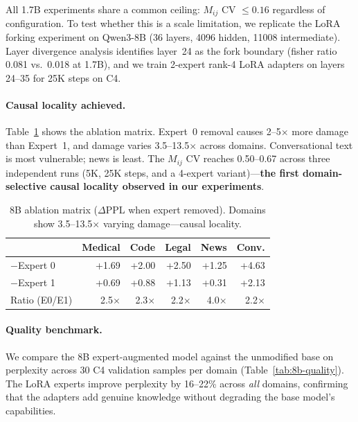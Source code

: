 \documentclass{article}
\begin{document}
All 1.7B experiments share a common ceiling: $M_{ij}$ CV $\leq 0.16$ regardless
of configuration. To test whether this is a scale limitation, we replicate the
LoRA forking experiment on Qwen3-8B (36 layers, 4096 hidden, 11008
intermediate). Layer divergence analysis identifies layer~24 as the fork
boundary (fisher ratio 0.081 vs.\ 0.018 at 1.7B), and we train 2-expert
rank-4 LoRA adapters on layers 24--35 for 25K steps on C4.

\paragraph{Causal locality achieved.}
Table~\ref{tab:8b-mij} shows the ablation matrix. Expert~0 removal causes
2--5$\times$ more damage than Expert~1, and damage varies 3.5--13.5$\times$
across domains. Conversational text is most vulnerable; news is least. The
$M_{ij}$ CV reaches 0.50--0.67 across three independent runs (5K, 25K steps,
and a 4-expert variant)---\textbf{the first domain-selective causal locality
observed in our experiments}.

\begin{table}[h]
\centering
\caption{8B ablation matrix ($\Delta$PPL when expert removed). Domains show
3.5--13.5$\times$ varying damage---causal locality.}
\label{tab:8b-mij}
\begin{tabular}{@{}lrrrrr@{}}
\toprule
 & Medical & Code & Legal & News & Conv. \\
\midrule
$-$Expert 0 & +1.69 & +2.00 & +2.50 & +1.25 & +4.63 \\
$-$Expert 1 & +0.69 & +0.88 & +1.13 & +0.31 & +2.13 \\
\midrule
Ratio (E0/E1) & 2.5$\times$ & 2.3$\times$ & 2.2$\times$ & 4.0$\times$ & 2.2$\times$ \\
\bottomrule
\end{tabular}
\end{table}

\paragraph{Quality benchmark.}
We compare the 8B expert-augmented model against the unmodified base on
perplexity across 30 C4 validation samples per domain
(Table~\ref{tab:8b-quality}). The LoRA experts improve perplexity by
16--22\% across \emph{all} domains, confirming that the adapters add genuine
knowledge without degrading the base model's capabilities.
\end{document}
